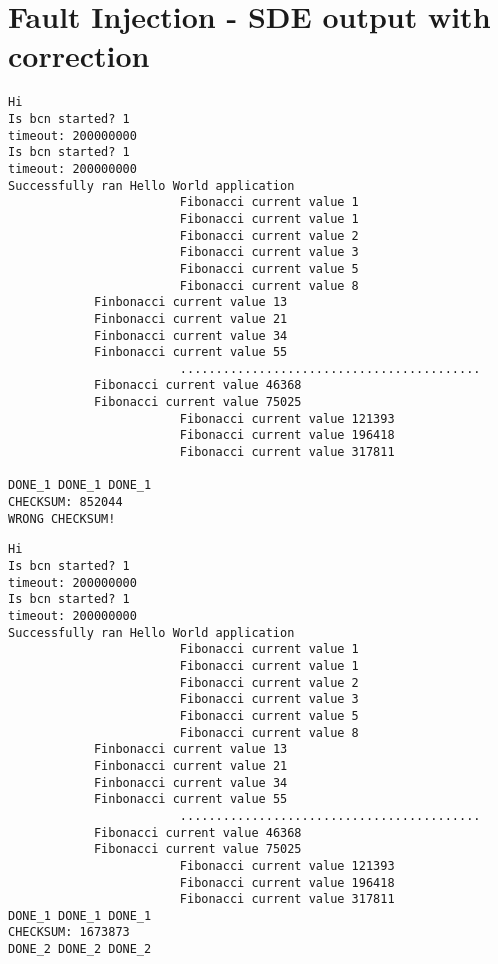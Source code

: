 \chapter{Fault Injection - SDE output with correction}

\begin{lstlisting}[style=preformatted, caption={SDE output - before correction}]
Hi
Is bcn started? 1
timeout: 200000000
Is bcn started? 1
timeout: 200000000
Successfully ran Hello World application
						Fibonacci current value 1
						Fibonacci current value 1
						Fibonacci current value 2
						Fibonacci current value 3
						Fibonacci current value 5
						Fibonacci current value 8
            Finbonacci current value 13
            Finbonacci current value 21
            Finbonacci current value 34
            Finbonacci current value 55
						..........................................
            Fibonacci current value 46368
            Fibonacci current value 75025
						Fibonacci current value 121393
						Fibonacci current value 196418
						Fibonacci current value 317811

DONE_1 DONE_1 DONE_1
CHECKSUM: 852044
WRONG CHECKSUM!
\end{lstlisting}
\newpage
\begin{lstlisting}[style=preformatted, caption={SDE output - after correction}]
Hi
Is bcn started? 1
timeout: 200000000
Is bcn started? 1
timeout: 200000000
Successfully ran Hello World application
						Fibonacci current value 1
						Fibonacci current value 1
						Fibonacci current value 2
						Fibonacci current value 3
						Fibonacci current value 5
						Fibonacci current value 8
            Finbonacci current value 13
            Finbonacci current value 21
            Finbonacci current value 34
            Finbonacci current value 55
						..........................................
            Fibonacci current value 46368
            Fibonacci current value 75025
						Fibonacci current value 121393
						Fibonacci current value 196418
						Fibonacci current value 317811
DONE_1 DONE_1 DONE_1
CHECKSUM: 1673873
DONE_2 DONE_2 DONE_2
\end{lstlisting}





